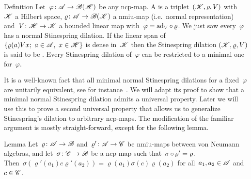 \documentclass[b]{subfiles}
\begin{document}
\begin{parsec}%
\begin{point}{Definition}%
Let~$\varphi\colon \mathscr{A} \to \mathscr{B}(\mathscr{H})$
    be any ncp-map.
A 
    is a triplet~$(\mathscr{K},\varrho, V)$
    with~$\mathscr{K}$ a Hilbert space,
    $\varrho\colon \mathscr{A} \to \mathscr{B}(\mathscr{K})$ a nmiu-map
        (i.e.~normal representation)
        and~$V\colon \mathscr{H} \to \mathscr{K}$ a bounded linear map
        with~$\varphi = \mathrm{ad}_V \mathop{\circ} \varrho$.
We just saw every~$\varphi$ has a normal Stinespring dilation.
If the linear span of~$\{ \varrho(a) Vx; \ a \in \mathscr{A},\ x\in \mathscr{H}\}$
is dense in~$\mathscr{K}$
then the Stinespring dilation $(\mathscr{K},\varrho,V)$ is said to be .
Every Stinespring dilation of~$\varphi$ can be restricted to a minimal one
    for~$\varphi$.
\end{point}
\begin{point}%
It is a well-known fact that all minimal normal Stinespring dilations
    for a fixed~$\varphi$ are unitarily equivalent,
    see for instance~\cite[Proposition 4.2]{paulsen}.
We will adapt its proof to show that a minimal normal Stinespring
    dilation admits a universal property.
Later we will use this to prove a second universal property 
    that allows us to generalize Stinespring's dilation to
    arbitrary ncp-maps.
The modification of the familiar argument
    is mostly straight-forward, except for the following lemma.
\end{point}
\begin{point}{Lemma}%
Let~$\varrho\colon \mathscr{A} \to \mathscr{B}$ and~$\varrho'\colon \mathscr{A} \to \mathscr{C}$
    be nmiu-maps between von Neumann algebras,
        and let~$\sigma \colon \mathscr{C} \to \mathscr{B}$ be a ncp-map
        such that~$\sigma \mathop{\circ} \varrho' = \varrho$.\\
Then~$\sigma(\varrho'(a_1)c \varrho'(a_2)) =  \varrho(a_1) \sigma(c) \varrho(a_2)$
    for all~$a_1,a_2 \in \mathscr{A}$ and~$c \in \mathscr{C}$.


\end{point}
\end{parsec}
\end{document}
